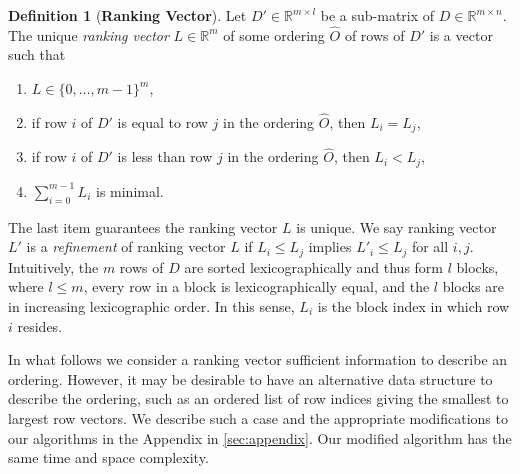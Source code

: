\documentclass[a4paper,10pt,reqno]{amsart}
\newcommand\R{\mathbb R}
\theoremstyle{definition}
\newtheorem{definition}{Definition}
\begin{document}
\begin{definition}[\bf Ranking Vector]
Let $D' \in \R^{m \times l}$ be a sub-matrix of $D \in \R^{m \times n}$. 
The unique \emph{ranking vector} $L \in \R^m$ of some 
ordering $\widehat O$ of rows of $D'$ is a vector such that
\begin{enumerate}
    \item $L \in \{0,\ldots,m-1\}^m$,
    \item if row $i$ of $D'$ is equal to row $j$ in the ordering $\widehat O$, then $L_i = L_j$,
    \item if row $i$ of $D'$ is less than row $j$ in the ordering $\widehat O$, then $L_i < L_j$,
    \item $\sum_{i=0}^{m-1} L_i$ is minimal.
\end{enumerate}
\end{definition}
The last item guarantees the ranking vector $L$ is unique. We say ranking
vector $L'$ is a \emph{refinement} of ranking vector $L$ if $L_i \leq L_j$
implies $L'_i \leq L_j$ for all $i,j$.
Intuitively, the $m$ rows of $D$ are sorted lexicographically and thus form
$l$ blocks, where $l \leq m$, every row in a block is lexicographically equal,
and the $l$ blocks are in increasing lexicographic order. In this sense, $L_i$
is the block index in which row $i$ resides.

In what follows we consider a ranking vector sufficient information to describe
an ordering. However, it may be desirable to have an alternative data structure
to describe the ordering, such as an ordered list of row indices giving the
smallest to largest row vectors. We describe such a case and the appropriate 
modifications to our algorithms in the Appendix in \autoref{sec:appendix}.
Our modified algorithm has the same time and space complexity.
\end{document}
